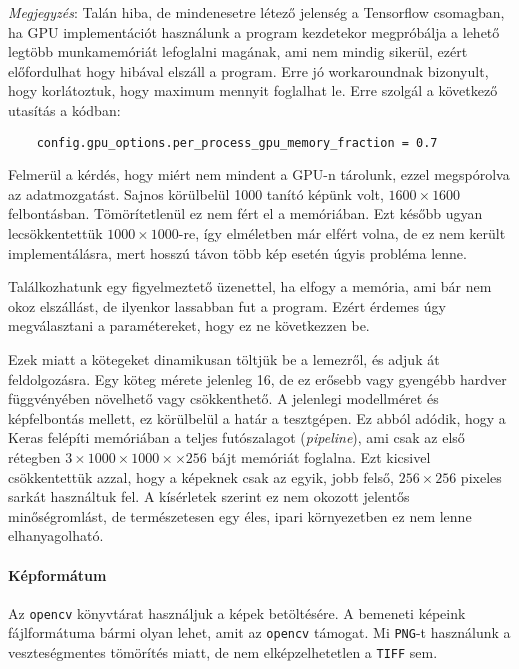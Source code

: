 \textit{Megjegyzés}: Talán hiba, de mindenesetre létező jelenség a Tensorflow csomagban, ha GPU implementációt használunk a program kezdetekor megpróbálja a lehető legtöbb 
munkamemóriát lefoglalni magának, ami nem mindig sikerül, 
ezért előfordulhat hogy hibával elszáll a program. Erre jó workaroundnak bizonyult, hogy
korlátoztuk, hogy maximum mennyit foglalhat le. Erre szolgál a következő utasítás a kódban:
\begin{lstlisting}
	config.gpu_options.per_process_gpu_memory_fraction = 0.7
\end{lstlisting}


Felmerül a kérdés, hogy miért nem mindent a GPU-n tárolunk, ezzel megspórolva az adatmozgatást.
Sajnos körülbelül 1000 tanító képünk volt, $ 1600 \times 1600 $ felbontásban. 
Tömörítetlenül ez nem fért el a memóriában. Ezt később ugyan lecsökkentettük
$ 1000 \times 1000 $-re, így elméletben már elfért volna, de ez nem került implementálásra,
mert hosszú távon több kép esetén úgyis probléma lenne.



Találkozhatunk egy figyelmeztető üzenettel, ha elfogy a memória, ami bár nem 
okoz elszállást, de ilyenkor lassabban fut a program. Ezért érdemes úgy megválasztani
a paramétereket, hogy ez ne következzen be.


Ezek miatt a kötegeket dinamikusan töltjük be a lemezről, és adjuk át feldolgozásra.
Egy köteg mérete jelenleg 16, de ez erősebb vagy gyengébb hardver függvényében 
növelhető vagy csökkenthető. A jelenlegi modellméret és képfelbontás mellett, ez 
körülbelül a határ a tesztgépen. Ez abból adódik, hogy a Keras felépíti memóriában 
a teljes futószalagot (\textit{pipeline}), ami csak az első rétegben
$ 3 \times 1000 \times 1000 \times \times 256 $ bájt memóriát foglalna.
Ezt kicsivel csökkentettük azzal, hogy a képeknek csak az egyik, jobb felső,
$ 256 \times 256 $ pixeles sarkát használtuk fel. A kísérletek szerint ez nem okozott
jelentős minőségromlást, de természetesen egy éles, ipari környezetben ez nem lenne
elhanyagolható.


\paragraph{Képformátum}
Az \texttt{opencv} könyvtárat használjuk a képek betöltésére.
A bemeneti képeink fájlformátuma bármi olyan lehet, amit az \texttt{opencv} támogat.
Mi \texttt{PNG}-t használunk a veszteségmentes tömörítés miatt, de nem elképzelhetetlen
a \texttt{TIFF} sem.


